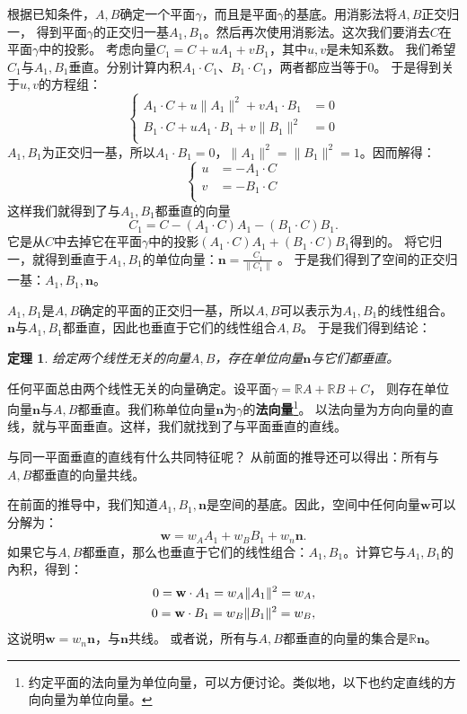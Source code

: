 \documentclass[12pt,UTF8]{ctexbook}
\newtheorem{tm}{定理}[section]
\begin{document}
根据已知条件，$A,B$确定一个平面$\gamma$，而且是平面$\gamma$的基底。用消影法将$A,B$正交归一，
得到平面$\gamma$的正交归一基$A_1,B_1$。然后再次使用消影法。这次我们要消去$C$在平面$\gamma$中的投影。
考虑向量$C_1=C+uA_1+vB_1$，其中$u,v$是未知系数。
我们希望$C_1$与$A_1,B_1$垂直。分别计算内积$A_1\cdot C_1$、$B_1\cdot C_1$，两者都应当等于$0$。
于是得到关于$u,v$的方程组：
$$
    \left\{
    \begin{array}{cl}
    A_1\cdot C + u\|A_1\|^2 + vA_1\cdot B_1 &= 0 \\
    B_1\cdot C + uA_1\cdot B_1 + v\|B_1\|^2 &= 0 \\
    \end{array}
    \right.
$$
$A_1,B_1$为正交归一基，所以$A_1\cdot B_1 = 0$，$\|A_1\|^2 = \|B_1\|^2 = 1$。因而解得：
$$
    \left\{
    \begin{array}{cl}
    u &= -A_1\cdot C \\
    v &= -B_1\cdot C \\
    \end{array}
    \right.
$$
这样我们就得到了与$A_1,B_1$都垂直的向量
$$ C_1 = C - (A_1\cdot C)A_1 - (B_1\cdot C)B_1. $$
它是从$C$中去掉它在平面$\gamma$中的投影$(A_1\cdot C)A_1 + (B_1\cdot C)B_1$得到的。
将它归一，就得到垂直于$A_1,B_1$的单位向量：$\mathbf{n} = \frac{C_1}{\|C_1\|}$ 。
于是我们得到了空间的正交归一基：$A_1,B_1,\mathbf{n}$。

$A_1,B_1$是$A,B$确定的平面的正交归一基，所以$A,B$可以表示为$A_1,B_1$的线性组合。
$\mathbf{n}$与$A_1,B_1$都垂直，因此也垂直于它们的线性组合$A,B$。
于是我们得到结论：
\begin{tm}\label{tm:1-3-30}
    给定两个线性无关的向量$A,B$，存在单位向量$\mathbf{n}$与它们都垂直。
\end{tm}
任何平面总由两个线性无关的向量确定。设平面$\gamma = \mathbb{R}A + \mathbb{R}B + C$，
则存在单位向量$\mathbf{n}$与$A,B$都垂直。我们称单位向量$\mathbf{n}$为$\gamma$的\textbf{法向量}\footnote{约定平面的法向量为单位向量，可以方便讨论。类似地，以下也约定直线的方向向量为单位向量。}。
以法向量为方向向量的直线，就与平面垂直。这样，我们就找到了与平面垂直的直线。

与同一平面垂直的直线有什么共同特征呢？
从前面的推导还可以得出：所有与$A,B$都垂直的向量共线。

在前面的推导中，我们知道$A_1,B_1,\mathbf{n}$是空间的基底。因此，空间中任何向量$\mathbf{w}$可以分解为：
$$ \mathbf{w} = w_A A_1 + w_B B_1 + w_n \mathbf{n}. $$
如果它与$A,B$都垂直，那么也垂直于它们的线性组合：$A_1,B_1$。计算它与$A_1,B_1$的內积，得到：
\begin{align}
    0 = \mathbf{w}\cdot A_1  = w_A\|A_1\|^2 = w_A, \notag \\
    0 = \mathbf{w}\cdot B_1  = w_B\|B_1\|^2 = w_B, \notag 
\end{align}
这说明$\mathbf{w} = w_n \mathbf{n}$，与$\mathbf{n}$共线。
或者说，所有与$A,B$都垂直的向量的集合是$\mathbb{R}\mathbf{n}$。
\end{document}
